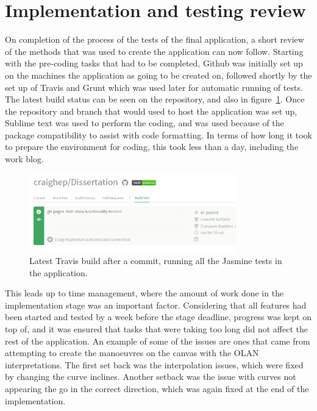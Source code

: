 \section{Implementation and testing review}
On completion of the process of the tests of the final application, a short review of the methods that was used to create the application can now follow. Starting with the pre-coding tasks that had to be completed, Github was initially set up on the machines the application as going to be created on, followed shortly by the set up of Travis and Grunt which was used later for automatic running of tests. The latest build status can be seen on the repository, and also in figure~\ref{fig:travis}. Once the repository and branch that would used to host the application was set up, Sublime text was used to perform the coding, and was used because of the package compatibility to assist with code formatting. In terms of how long it took to prepare the environment for coding, this took less than a day, including the work blog.

\begin{figure}[h!]
  \centering
      \includegraphics[width=0.8\textwidth]{images/travis.png}
  \caption{Latest Travis build after a commit, running all the Jasmine tests in the application.}
  \label{fig:travis}
\end{figure}

This leads up to time management, where the amount of work done in the implementation stage was an important factor. Considering that all features had been started and tested by a week before the stage deadline, progress was kept on top of, and it was ensured that tasks that were taking too long did not affect the rest of the application. An example of some of the issues are ones that came from attempting to create the manoeuvres on the canvas with the OLAN interpretations. The first set back was the interpolation issues, which were fixed by changing the curve inclines. Another setback was the issue with curves not appearing the go in the correct direction, which was again fixed at the end of the implementation. 

